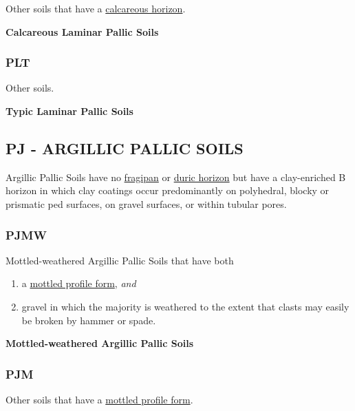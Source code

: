 \documentclass[
  letterpaper,
  DIV=11,
  numbers=noendperiod]{scrreprt}
\providecommand{\tightlist}{%
  \setlength{\itemsep}{0pt}\setlength{\parskip}{0pt}}\usepackage{longtable,booktabs,array}
\begin{document}
Other soils that have a \protect\hyperlink{sec-diag-calch}{calcareous
horizon}.

\textbf{Calcareous Laminar Pallic Soils}

\hypertarget{sec-key-PLT}{%
\subsubsection{\texorpdfstring{\textbf{PLT}}{PLT}}\label{sec-key-PLT}}

Other soils.

\textbf{Typic Laminar Pallic Soils}

\hypertarget{sec-PJ}{%
\subsection{\texorpdfstring{\textbf{PJ} - ARGILLIC PALLIC
SOILS}{PJ - ARGILLIC PALLIC SOILS}}\label{sec-PJ}}

Argillic Pallic Soils have no
\protect\hyperlink{sec-diag-fpan}{fragipan} or
\protect\hyperlink{sec-diag-dpan}{duric horizon} but have a
clay-enriched B horizon in which clay coatings occur predominantly on
polyhedral, blocky or prismatic ped surfaces, on gravel surfaces, or
within tubular pores.

\hypertarget{sec-key-PJMW}{%
\subsubsection{\texorpdfstring{\textbf{PJMW}}{PJMW}}\label{sec-key-PJMW}}

Mottled-weathered Argillic Pallic Soils that have both

\begin{enumerate}
\def\labelenumi{\arabic{enumi}.}
\tightlist
\item
  a \protect\hyperlink{sec-diag-mottpf}{mottled profile form},
  \emph{and}
\item
  gravel in which the majority is weathered to the extent that clasts
  may easily be broken by hammer or spade.
\end{enumerate}

\textbf{Mottled-weathered Argillic Pallic Soils}

\hypertarget{sec-key-PJM}{%
\subsubsection{\texorpdfstring{\textbf{PJM}}{PJM}}\label{sec-key-PJM}}

Other soils that have a \protect\hyperlink{sec-diag-mottpf}{mottled
profile form}.
\end{document}
